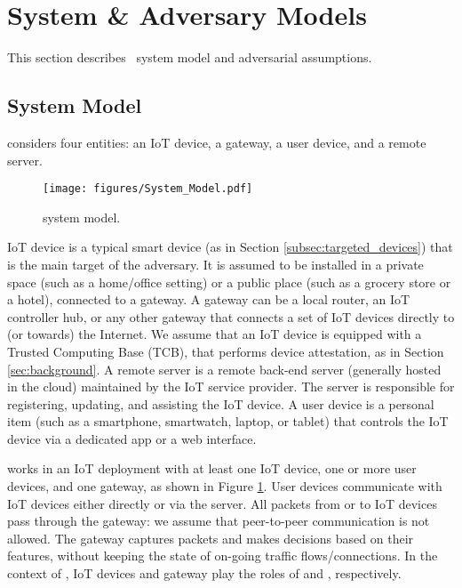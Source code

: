 \section{System \& Adversary Models} \label{sec:systemmodel}
This section describes \system\ system model and adversarial assumptions. 

\subsection{System Model} 
\system considers four entities: an IoT device, a gateway, a user device, and a remote server.
\begin{figure}
    \centering
    \texttt{[image: figures/System\_Model.pdf]}
    \caption{\system system model.}
    \label{fig:system_model}
\end{figure}

IoT device is a typical smart device (as in Section \ref{subsec:targeted_devices}) that is the main target of the adversary. It is assumed to be installed in a private space (such as a home/office setting) or a public place (such as a grocery store or a hotel), connected to a gateway. A gateway can be a local router, an IoT controller hub, or any other gateway that connects a set of IoT devices directly to (or towards) the Internet. We assume that an IoT device is equipped with a Trusted Computing Base (TCB), that performs device attestation, as in Section \ref{sec:background}. A remote server is a remote back-end server (generally hosted in the cloud) maintained by the IoT service provider. The server is responsible for registering, updating, and assisting the IoT device. A user device is a personal item (such as a smartphone, smartwatch, laptop, or tablet) that controls the IoT device via a dedicated app or a web interface. 

\system{} works in an IoT deployment with at least one IoT device, one or more user devices, and one gateway, as shown in Figure \ref{fig:system_model}. User devices communicate with IoT devices either directly or via the server. All packets from or to IoT devices pass through the gateway: we assume that peer-to-peer communication is not allowed. The gateway captures packets and makes decisions based on their features, without keeping the state of on-going traffic flows/connections. In the context of \ra, IoT devices and gateway play the roles of \prv and \vrf, respectively.

